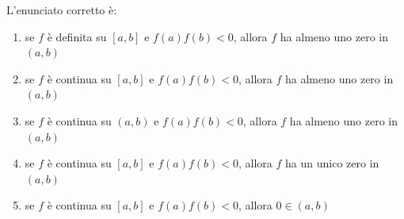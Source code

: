 \begin{quiz}
L'enunciato corretto \`e:
\begin{enumerate}[label=\alph*),leftmargin=1.3cm,itemsep=3pt,topsep=5pt]\item se $f$ \`e definita su $[a,b]$ e $f(a)f(b)<0$, allora $f$ ha almeno uno zero in $(a,b)$\item se $f$ \`e continua su $[a,b]$ e $f(a)f(b)<0$, allora $f$ ha almeno uno zero in $(a,b)$\item se $f$ \`e continua su $(a,b)$ e $f(a)f(b)<0$, allora $f$ ha almeno uno zero in $(a,b)$\item se $f$ \`e continua su $[a,b]$ e $f(a)f(b)<0$, allora $f$ ha un unico zero in $(a,b)$\item se $f$ \`e continua su $[a,b]$ e $f(a)f(b)<0$, allora $0\in(a,b)$\end{enumerate}
\end{quiz}

